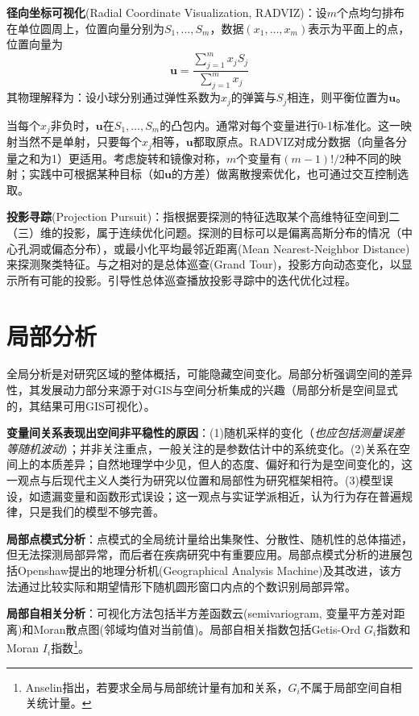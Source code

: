 \par \textbf{径向坐标可视化}(Radial Coordinate Visualization, RADVIZ)：设$m$个点均匀排布在单位圆周上，位置向量分别为$S_1,\dots,S_m$，数据$(x_1,\dots,x_m)$表示为平面上的点，位置向量为
\begin{equation}
    \mathbf{u}=\frac{\sum_{j=1}^m x_j S_j}{\sum_{j=1}^m x_j}
\end{equation}
其物理解释为：设小球分别通过弹性系数为$x_j$的弹簧与$S_j$相连，则平衡位置为$\mathbf{u}$。

\par 当每个$x_j$非负时，$\mathbf{u}$在$S_1,\dots,S_m$的凸包内。通常对每个变量进行0-1标准化。这一映射当然不是单射，只要每个$x_j$相等，$\mathbf{u}$都取原点。RADVIZ对成分数据（向量各分量之和为1）更适用。考虑旋转和镜像对称，$m$个变量有$(m-1)!/2$种不同的映射；实践中可根据某种目标（如$\mathbf{u}$的方差）做离散搜索优化，也可通过交互控制选取。

\par \textbf{投影寻踪}(Projection Pursuit)：指根据要探测的特征选取某个高维特征空间到二（三）维的投影，属于连续优化问题。探测的目标可以是偏离高斯分布的情况（中心孔洞或偏态分布），或最小化平均最邻近距离(Mean Nearest-Neighbor Distance)来探测聚类特征。与之相对的是总体巡查(Grand Tour)，投影方向动态变化，以显示所有可能的投影。引导性总体巡查播放投影寻踪中的迭代优化过程。

\section{局部分析}

\par 全局分析是对研究区域的整体概括，可能隐藏空间变化。局部分析强调空间的差异性，其发展动力部分来源于对GIS与空间分析集成的兴趣（局部分析是空间显式的，其结果可用GIS可视化）。

\par \textbf{变量间关系表现出空间非平稳性的原因}：(1)随机采样的变化（\emph{也应包括测量误差等随机波动}）；并非关注重点，一般关注的是参数估计中的系统变化。(2)关系在空间上的本质差异；自然地理学中少见，但人的态度、偏好和行为是空间变化的，这一观点与后现代主义人类行为研究以位置和局部性为研究框架相符。(3)模型误设，如遗漏变量和函数形式误设；这一观点与实证学派相近，认为行为存在普遍规律，只是我们的模型不够完善。

\par \textbf{局部点模式分析}：点模式的全局统计量给出集聚性、分散性、随机性的总体描述，但无法探测局部异常，而后者在疾病研究中有重要应用。局部点模式分析的进展包括Openshaw提出的地理分析机(Geographical Analysis Machine)及其改进，该方法通过比较实际和期望情形下随机圆形窗口内点的个数识别局部异常。

\par \textbf{局部自相关分析}：可视化方法包括半方差函数云(semivariogram, 变量平方差对距离)和Moran散点图(邻域均值对当前值)。局部自相关指数包括Getis-Ord $G_i$指数和Moran $I_i$指数\footnote{Anselin指出，若要求全局与局部统计量有加和关系，$G_i$不属于局部空间自相关统计量。}。

